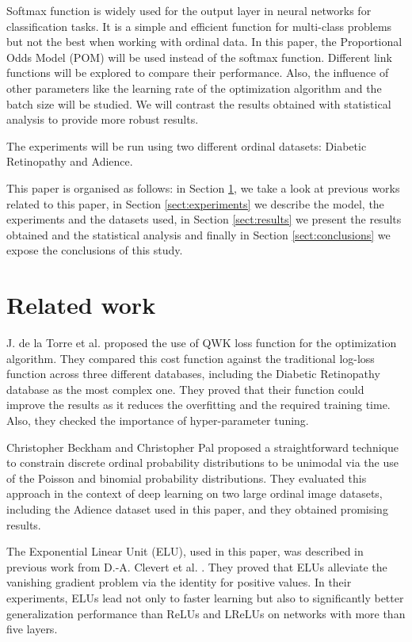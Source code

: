 \documentclass[10pt, a4paper, titlepage, twocolumn]{article}
\begin{document}
	Softmax function is widely used for the output layer in neural networks for classification tasks. It is a simple and efficient function for multi-class problems but not the best when working with ordinal data. In this paper, the Proportional Odds Model (POM) will be used instead of the softmax function. Different link functions will be explored to compare their performance. Also, the influence of other parameters like the learning rate of the optimization algorithm and the batch size will be studied. We will contrast the results obtained with statistical analysis to provide more robust results.
	
	The experiments will be run using two different ordinal datasets: Diabetic Retinopathy and Adience.
	
	This paper is organised as follows: in Section \ref{sect:relatedwork}, we take a look at previous works related to this paper, in Section \ref{sect:experiments} we describe the model, the experiments and the datasets used, in Section \ref{sect:results} we present the results obtained and the statistical analysis and finally in Section \ref{sect:conclusions} we expose the conclusions of this study.
	
	\section{Related work}
	\label{sect:relatedwork}
	J. de la Torre et al. \cite{de2018weighted} proposed the use of QWK loss function for the optimization algorithm. They compared this cost function against the traditional log-loss function across three different databases, including the Diabetic Retinopathy database as the most complex one. They proved that their function could improve the results as it reduces the overfitting and the required training time. Also, they checked the importance of hyper-parameter tuning.

	Christopher Beckham and Christopher Pal \cite{beckham2017unimodal} proposed a straightforward technique to constrain discrete ordinal probability distributions to be unimodal via the use of the Poisson and binomial probability distributions. They evaluated this approach in the context of deep learning on two large ordinal image datasets, including the Adience dataset used in this paper, and they obtained promising results.
	
	The Exponential Linear Unit (ELU), used in this paper, was described in previous work from D.-A. Clevert et al. \cite{clevert2015fast}. They proved that ELUs alleviate the vanishing gradient problem via the identity for positive values. In their experiments, ELUs lead not only to faster learning but also to significantly better generalization performance than ReLUs and LReLUs on networks with more than five layers.
	
\end{document}
